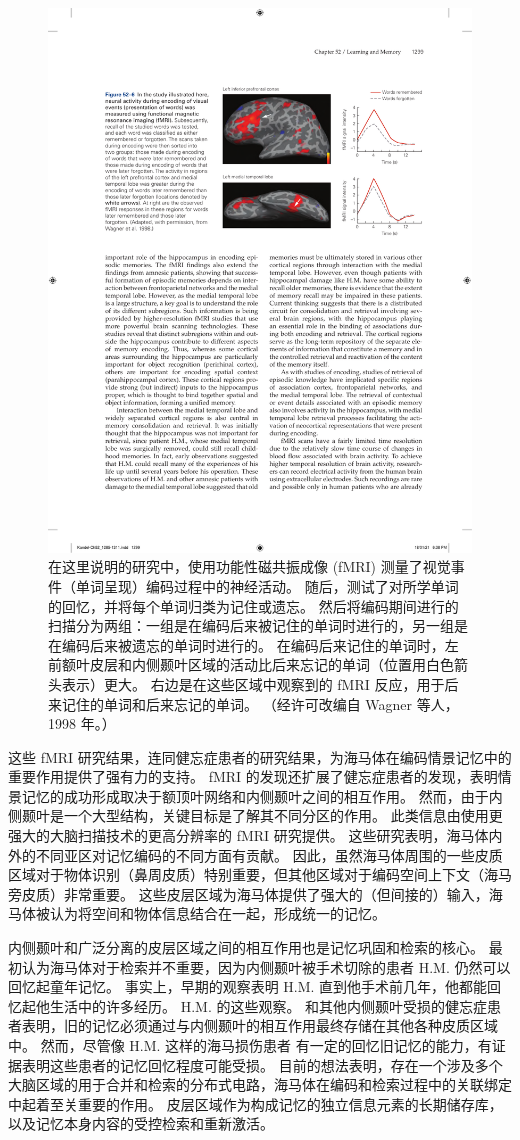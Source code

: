 \begin{figure}[htbp]
	\centering
	\includegraphics[width=0.7\linewidth]{chap52/fig_52_6}
	\caption{在这里说明的研究中，使用功能性磁共振成像 (fMRI) 测量了视觉事件（单词呈现）编码过程中的神经活动。 随后，测试了对所学单词的回忆，并将每个单词归类为记住或遗忘。 然后将编码期间进行的扫描分为两组：一组是在编码后来被记住的单词时进行的，另一组是在编码后来被遗忘的单词时进行的。 在编码后来记住的单词时，左前额叶皮层和内侧颞叶区域的活动比后来忘记的单词（位置用白色箭头表示）更大。 右边是在这些区域中观察到的 fMRI 反应，用于后来记住的单词和后来忘记的单词。 （经许可改编自 Wagner 等人，1998 年。）}
	\label{fig:52_6}
\end{figure}

这些 fMRI 研究结果，连同健忘症患者的研究结果，为海马体在编码情景记忆中的重要作用提供了强有力的支持。 fMRI 的发现还扩展了健忘症患者的发现，表明情景记忆的成功形成取决于额顶叶网络和内侧颞叶之间的相互作用。 然而，由于内侧颞叶是一个大型结构，关键目标是了解其不同分区的作用。 此类信息由使用更强大的大脑扫描技术的更高分辨率的 fMRI 研究提供。 这些研究表明，海马体内外的不同亚区对记忆编码的不同方面有贡献。 因此，虽然海马体周围的一些皮质区域对于物体识别（鼻周皮质）特别重要，但其他区域对于编码空间上下文（海马旁皮质）非常重要。 这些皮层区域为海马体提供了强大的（但间接的）输入，海马体被认为将空间和物体信息结合在一起，形成统一的记忆。

内侧颞叶和广泛分离的皮层区域之间的相互作用也是记忆巩固和检索的核心。 最初认为海马体对于检索并不重要，因为内侧颞叶被手术切除的患者 H.M. 仍然可以回忆起童年记忆。 事实上，早期的观察表明 H.M. 直到他手术前几年，他都能回忆起他生活中的许多经历。 H.M. 的这些观察。 和其他内侧颞叶受损的健忘症患者表明，旧的记忆必须通过与内侧颞叶的相互作用最终存储在其他各种皮质区域中。 然而，尽管像 H.M. 这样的海马损伤患者 有一定的回忆旧记忆的能力，有证据表明这些患者的记忆回忆程度可能受损。 目前的想法表明，存在一个涉及多个大脑区域的用于合并和检索的分布式电路，海马体在编码和检索过程中的关联绑定中起着至关重要的作用。 皮层区域作为构成记忆的独立信息元素的长期储存库，以及记忆本身内容的受控检索和重新激活。

